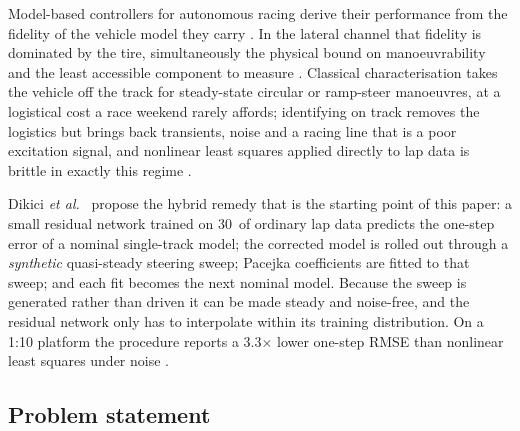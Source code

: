 \documentclass[lineno,12pt]{sn-jnl}
\makeatletter
\newif\ifsiu@prev
\DeclareRobustCommand{\siu@sep}{\ifsiu@prev\,\fi}
\DeclareRobustCommand{\siu@unit}[1]{\siu@sep\text{#1}\siu@prevtrue}
\DeclareRobustCommand{\siu@pre}[1]{\siu@sep\text{#1}\siu@prevfalse}
\DeclareRobustCommand{\siu@div}[1]{\text{#1}\siu@prevfalse}
\DeclareRobustCommand{\meter}{m}
\DeclareRobustCommand{\second}{s}
\DeclareRobustCommand{\gram}{g}
\DeclareRobustCommand{\newton}{N}
\DeclareRobustCommand{\radian}{rad}
\DeclareRobustCommand{\hertz}{Hz}
\DeclareRobustCommand{\percent}{\%}
\DeclareRobustCommand{\g}{\textit{g}}
\DeclareRobustCommand{\kilo}{k}
\DeclareRobustCommand{\milli}{m}
\DeclareRobustCommand{\per}{/}
\DeclareRobustCommand{\squared}{\ensuremath{^{2}}}
\providecommand{\degree}{\ensuremath{^{\circ}}}
\DeclareRobustCommand{\si}[1]{\begingroup
  \siu@prevfalse
  \renewcommand{\meter}{\siu@unit{m}}%
  \renewcommand{\second}{\siu@unit{s}}%
  \renewcommand{\gram}{\siu@unit{g}}%
  \renewcommand{\newton}{\siu@unit{N}}%
  \renewcommand{\radian}{\siu@unit{rad}}%
  \renewcommand{\hertz}{\siu@unit{Hz}}%
  \renewcommand{\percent}{\siu@unit{\%}}%
  \renewcommand{\degree}{\siu@unit{\ensuremath{^{\circ}}}}%
  \renewcommand{\g}{\siu@unit{\textit{g}}}%
  \renewcommand{\kilo}{\siu@pre{k}}%
  \renewcommand{\milli}{\siu@pre{m}}%
  \renewcommand{\per}{\siu@div{/}}%
  \renewcommand{\squared}{\ensuremath{^{2}}}%
  #1\endgroup}
\DeclareRobustCommand{\num}[1]{#1}
\DeclareRobustCommand{\SI}[2]{#1\,\si{#2}}
\theoremstyle{thmstyleone}%
\theoremstyle{thmstyletwo}%
\theoremstyle{thmstylethree}%
\makeatother
\begin{document}
Model-based controllers for autonomous racing derive their
performance from the fidelity of the vehicle model they carry
\cite{liniger2015,kabzan2019lbmpc,forzaeth2024}. In the lateral channel that
fidelity is dominated by the tire, simultaneously the physical bound on
manoeuvrability and the least accessible component to measure
\cite{pacejka2012book,amz2020}. Classical characterisation takes the vehicle
off the track for steady-state circular or ramp-steer manoeuvres, at a
logistical cost a race weekend rarely affords; identifying on track removes the
logistics but brings back transients, noise and a racing line that is a poor
excitation signal, and nonlinear least squares applied directly to lap data is
brittle in exactly this regime \cite{ontrack2025}.

Dikici \emph{et al.}~\cite{ontrack2025} propose the hybrid remedy that is the
starting point of this paper: a small residual network trained on
\SI{30}{\second} of ordinary lap data predicts the one-step error of a nominal
single-track model; the corrected model is rolled out through a \emph{synthetic}
quasi-steady steering sweep; Pacejka coefficients are fitted to that sweep; and
each fit becomes the next nominal model. Because the sweep is generated rather
than driven it can be made steady and noise-free, and the residual network only
has to interpolate within its training distribution. On a 1:10 platform the
procedure reports a \num{3.3}$\times$ lower one-step RMSE than nonlinear least
squares under noise \cite{ontrack2025}.

\subsection{Problem statement}
\end{document}
